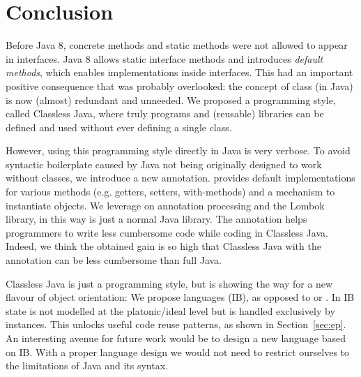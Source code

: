 \section{Conclusion}\label{sec:conclusion}
Before Java 8, concrete methods and static methods were not allowed
to appear in interfaces.  Java 8 allows static interface methods and
introduces \emph{default methods}, which enables implementations
inside interfaces. This had an important positive consequence that
was probably overlooked: the concept of class
(in Java) is now (almost) redundant and unneeded.
We proposed a programming style, called Classless Java, where
truly \objectoriented programs and (reusable) libraries
can be defined and used without ever defining a single class.

However, using this programming style directly in Java is very verbose.
To avoid syntactic boilerplate
caused by Java not being originally designed to work without classes,
we introduce a new \mixin annotation. \mixin provides default implementations
for various methods (e.g. getters, setters, with-methods) and a
mechanism to instantiate objects.
We leverage on annotation processing and the Lombok library, in this way
\mixin is just a normal Java library.
The \mixin annotation helps programmers
to write less cumbersome code while coding in Classless Java. Indeed,
we think the obtained gain is so high that Classless Java with the \mixin
annotation can be less cumbersome than full Java.

Classless Java is just a programming style, but is showing the way
for a new flavour of object orientation: We propose \interfacebased
\objectoriented languages (IB), as opposed to \classbased or
\prototypebased.  In IB state is not modelled at the platonic/ideal
level but is handled exclusively by instances.  This unlocks useful
code reuse patterns, as shown in Section~\ref{sec:ep}.
An interesting avenue for future work would be to design a new
language based on IB. With a proper language design we would not need
to restrict ourselves to the limitations of Java and its syntax.



